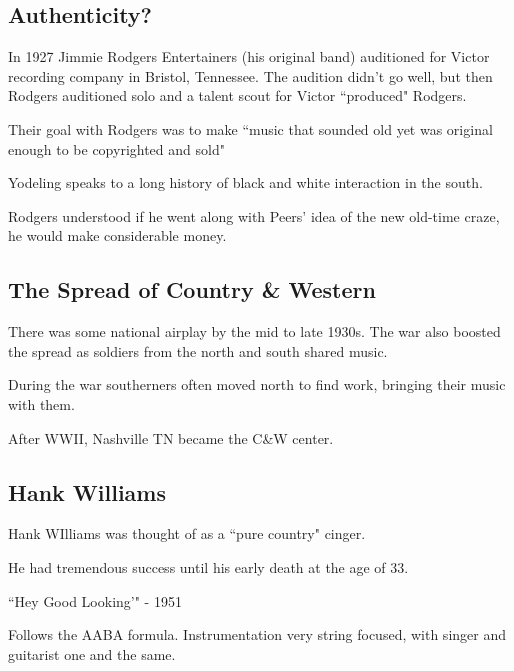 \documentclass[12pt, a4paper, twoside, openright, titlepage]{book}
\begin{document}
\subsection{Authenticity?}

In 1927 Jimmie Rodgers Entertainers (his original band) auditioned for Victor recording company in Bristol, Tennessee. The audition didn't go well, but then Rodgers auditioned solo and  a talent scout for Victor ``produced" Rodgers. 

\begin{rmk}{}{}
    Their goal with Rodgers was to make ``music that sounded old yet was original enough to be copyrighted and sold"
\end{rmk}

\begin{note}{}{}
    Yodeling speaks to a long history of black and white interaction in the south.
\end{note}

\begin{note}{}{}
    Rodgers understood if he went along with Peers' idea of the new old-time craze, he would make considerable money.
\end{note}


\subsection{The Spread of Country \& Western}

There was some national airplay by the mid to late 1930s. The war also boosted the spread as soldiers from the north and south shared music.

During the war southerners often moved north to find work, bringing their music with them.

\begin{rmk}{}{}
    After WWII, Nashville TN became the C\&W center.
\end{rmk}

\subsection{Hank Williams}

Hank WIlliams was thought of as a ``pure country" cinger.

He had tremendous success until his early death at the age of 33.

\begin{eg}{}{}
    ``Hey Good Looking'" - 1951

    Follows the AABA formula. Instrumentation very string focused, with singer and guitarist one and the same.
\end{eg}
\end{document}
